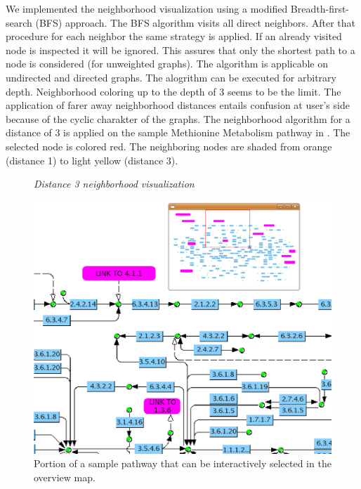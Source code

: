 We implemented the neighborhood visualization using a modified Breadth-first-search (BFS) approach\citep{Cormen2001}. The BFS algorithm visits all direct neighbors. After that procedure for each neighbor the same strategy is applied. If an already visited node is inspected it will be ignored. This assures that only the shortest path to a node is considered (for unweighted graphs). The algorithm is applicable on undirected and directed graphs.
The alogrithm can be executed for arbitrary depth. Neighborhood coloring up to the depth of 3 seems to be the limit. The application of farer away neighborhood distances entails confusion at user's side because of the cyclic charakter of the graphs. 
The neighborhood algorithm for a distance of 3 is applied on the sample Methionine Metabolism pathway in . The selected node is colored red. The neighboring nodes are shaded from orange (distance 1) to light yellow (distance 3).

\begin{figure}[ht]
\centering
{} 
\caption[Distance 3 neighborhood visualization]{\textit{Distance 3 neighborhood visualization}} 
\label{gfx:neighborhood_visualization_distance_3}
\end{figure}

\begin{figure}[ht]
  \centering
    \includegraphics[width=0.5\linewidth]{gfx/overview_method}
  \caption{Portion of a sample pathway that can be interactively selected in the overview map.}
  \label{fig:overview_method}
\end{figure}

